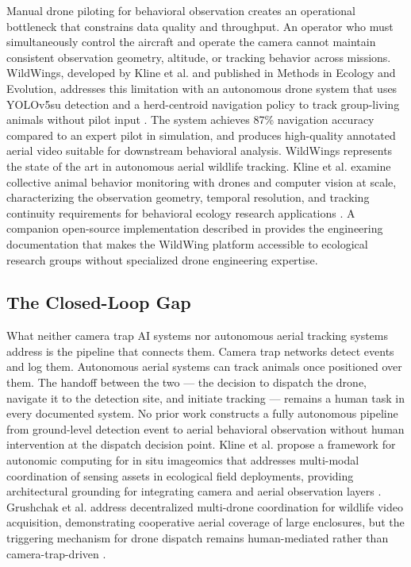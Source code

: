 Manual drone piloting for behavioral observation creates an operational bottleneck that constrains data quality and throughput. An operator who must simultaneously control the aircraft and operate the camera cannot maintain consistent observation geometry, altitude, or tracking behavior across missions. WildWings, developed by Kline et al. and published in Methods in Ecology and Evolution, addresses this limitation with an autonomous drone system that uses YOLOv5su detection and a herd-centroid navigation policy to track group-living animals without pilot input \cite{kline2025wildwing}. The system achieves 87\% navigation accuracy compared to an expert pilot in simulation, and produces high-quality annotated aerial video suitable for downstream behavioral analysis. WildWings represents the state of the art in autonomous aerial wildlife tracking. Kline et al. examine collective animal behavior monitoring with drones and computer vision at scale, characterizing the observation geometry, temporal resolution, and tracking continuity requirements for behavioral ecology research applications \cite{kline2025studying}. A companion open-source implementation described in \cite{kline2026wildwing} provides the engineering documentation that makes the WildWing platform accessible to ecological research groups without specialized drone engineering expertise.
\subsection{The Closed-Loop Gap}
\label{sec:closed_loop_gap}
What neither camera trap AI systems nor autonomous aerial tracking systems address is the pipeline that connects them. Camera trap networks detect events and log them. Autonomous aerial systems can track animals once positioned over them. The handoff between the two — the decision to dispatch the drone, navigate it to the detection site, and initiate tracking — remains a human task in every documented system. No prior work constructs a fully autonomous pipeline from ground-level detection event to aerial behavioral observation without human intervention at the dispatch decision point. Kline et al. propose a framework for autonomic computing for in situ imageomics that addresses multi-modal coordination of sensing assets in ecological field deployments, providing architectural grounding for integrating camera and aerial observation layers \cite{kline2023framework}. Grushchak et al. address decentralized multi-drone coordination for wildlife video acquisition, demonstrating cooperative aerial coverage of large enclosures, but the triggering mechanism for drone dispatch remains human-mediated rather than camera-trap-driven \cite{grushchak2024decentralized}.

